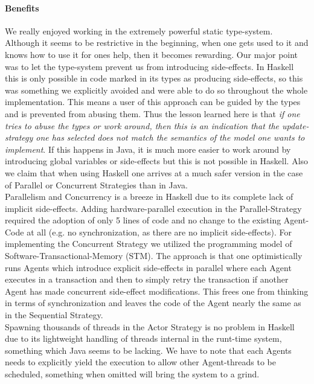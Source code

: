 \paragraph{Benefits}
We really enjoyed working in the extremely powerful static type-system. Although it seems to be restrictive in the beginning, when one gets used to it and knows how to use it for ones help, then it becomes rewarding. Our major point was to let the type-system prevent us from introducing side-effects. In Haskell this is only possible in code marked in its types as producing side-effects, so this was something we explicitly avoided and were able to do so throughout the whole implementation. This means a user of this approach can be guided by the types and is prevented from abusing them. Thus the lesson learned here is that \textit{if one tries to abuse the types or work around, then this is an indication that the update-strategy one has selected does not match the semantics of the model one wants to implement}. If this happens in Java, it is much more easier to work around by introducing global variables or side-effects but this is not possible in Haskell. Also we claim that when using Haskell one arrives at a much safer version in the case of Parallel or Concurrent Strategies than in Java.\\

Parallelism and Concurrency is a breeze in Haskell due to its complete lack of implicit side-effects. Adding hardware-parallel execution in the Parallel-Strategy required the adoption of only 5 lines of code and no change to the existing Agent-Code at all (e.g. no synchronization, as there are no implicit side-effects). For implementing the Concurrent Strategy we utilized the programming model of Software-Transactional-Memory (STM). The approach is that one optimistically runs Agents which introduce explicit side-effects in parallel where each Agent executes in a transaction and then to simply retry the transaction if another Agent has made concurrent side-effect modifications. This frees one from thinking in terms of synchronization and leaves the code of the Agent nearly the same as in the Sequential Strategy. \\
Spawning thousands of threads in the Actor Strategy is no problem in Haskell due to its lightweight handling of threads internal in the runt-time system, something which Java seems to be lacking. We have to note that each Agents needs to explicitly yield the execution to allow other Agent-threads to be scheduled, something when omitted will bring the system to a grind.

